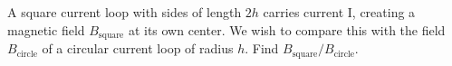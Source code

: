 A square current loop with sides of length $2h$ carries current I,
creating a magnetic field $B_\text{square}$ at its own center.
We wish to compare this with the field $B_\text{circle}$ of a circular current loop
of radius $h$. Find $B_\text{square}/B_\text{circle}$.\answercheck
